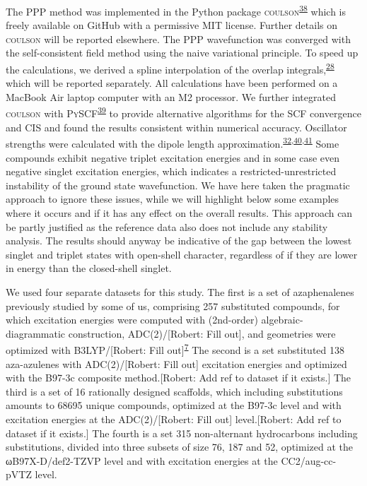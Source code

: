 \documentclass[
  number,
  3p]{elsarticle}
\begin{document}
The PPP method was implemented in the Python package
\textsc{coulson}\textsuperscript{\protect\hyperlink{ref-jornerCoulson}{38}}
which is freely available on GitHub with a permissive MIT license.
Further details on \textsc{coulson} will be reported elsewhere. The PPP
wavefunction was converged with the self-consistent field method using
the naive variational principle. To speed up the calculations, we
derived a spline interpolation of the overlap
integrals,\textsuperscript{\protect\hyperlink{ref-mullikenFormulasNumericalTables1949}{28}}
which will be reported separately. All calculations have been performed
on a MacBook Air laptop computer with an M2 processor. We further
integrated \textsc{coulson} with
\textsc{PySCF}\textsuperscript{\protect\hyperlink{ref-sunRecentDevelopmentsPySCF2020}{39}}
to provide alternative algorithms for the SCF convergence and CIS and
found the results consistent within numerical accuracy. Oscillator
strengths were calculated with the dipole length
approximation.\textsuperscript{\protect\hyperlink{ref-klessingerExcitedStatesPhotochemistry1995}{32},\protect\hyperlink{ref-jorgensenTimedependentHartreeFockCalculations1970}{40},\protect\hyperlink{ref-damourGroundExcitedStateDipole2023}{41}}
Some compounds exhibit negative triplet excitation energies and in some
case even negative singlet excitation energies, which indicates a
restricted-unrestricted instability of the ground state wavefunction. We
have here taken the pragmatic approach to ignore these issues, while we
will highlight below some examples where it occurs and if it has any
effect on the overall results. This approach can be partly justified as
the reference data also does not include any stability analysis. The
results should anyway be indicative of the gap between the lowest
singlet and triplet states with open-shell character, regardless of if
they are lower in energy than the closed-shell singlet.

We used four separate datasets for this study. The first is a set of
azaphenalenes previously studied by some of us, comprising 257
substituted compounds, for which excitation energies were computed with
(2nd-order) algebraic-diagrammatic construction, ADC(2)/{[}Robert: Fill
out{]}, and geometries were optimized with B3LYP/{[}Robert: Fill
out{]}\textsuperscript{\protect\hyperlink{ref-polliceOrganicMoleculesInverted2021}{7}}
The second is a set substituted 138 aza-azulenes with ADC(2)/{[}Robert:
Fill out{]} excitation energies and optimized with the B97-3c composite
method.{[}Robert: Add ref to dataset if it exists.{]} The third is a set
of 16 rationally designed scaffolds, which including substitutions
amounts to 68695 unique compounds, optimized at the B97-3c level and
with excitation energies at the ADC(2)/{[}Robert: Fill out{]}
level.{[}Robert: Add ref to dataset if it exists.{]} The fourth is a set
315 non-alternant hydrocarbons including substitutions, divided into
three subsets of size 76, 187 and 52, optimized at the ωB97X-D/def2-TZVP
level and with excitation energies at the CC2/aug-cc-pVTZ level.
\end{document}
